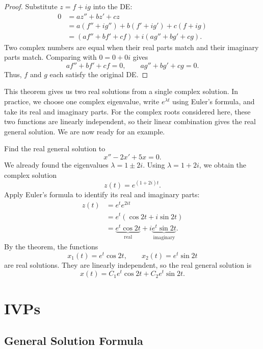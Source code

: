 \documentclass[10pt,letterpaper]{article}
\begin{document}
\begin{proof}
Substitute $z=f+ig$ into the DE:
\begin{align*}
0
&=az''+bz'+cz\\
&=a(f''+ig'')+b(f'+ig')+c(f+ig)\\
&=(af''+bf'+cf)+i(ag''+bg'+cg).
\end{align*}
Two complex numbers are equal when their real parts match
and their imaginary parts match. Comparing with $0=0+0i$ gives
\[
af''+bf'+cf=0,
\qquad
ag''+bg'+cg=0.
\]
Thus, $f$ and $g$ each satisfy the original DE.
\end{proof}

This theorem gives us two real solutions from a single complex
solution. In practice, we choose one complex eigenvalue, write
$e^{\lambda t}$ using Euler's formula, and take its real and
imaginary parts. For the complex roots considered here, these
two functions are linearly independent, so their linear
combination gives the real general solution. We are now ready for an example.

\begin{example}[1]
{
Find the real general solution to
\[
x''-2x'+5x=0.
\]
}
We already found the eigenvalues $\lambda=1\pm2i$.
Using $\lambda=1+2i$, we obtain the complex solution
\[
z(t)=e^{(1+2i)t}.
\]
Apply Euler's formula to identify its real and imaginary parts:
\begin{align*}
z(t)
&=e^t e^{2it}\\
&=e^t(\cos2t+i\sin2t)\\
&=\underbrace{e^t\cos2t}_{\text{real}}
+i\underbrace{e^t\sin2t}_{\text{imaginary}}.
\end{align*}
By the theorem, the functions
\[
x_1(t)=e^t\cos2t,
\qquad
x_2(t)=e^t\sin2t
\]
are real solutions. They are linearly independent, so the real
general solution is
\[
\boxed{
x(t)=C_1e^t\cos2t+C_2e^t\sin2t.
}
\]
\end{example}

\section{IVPs}

\subsection{General Solution Formula}
\end{document}
